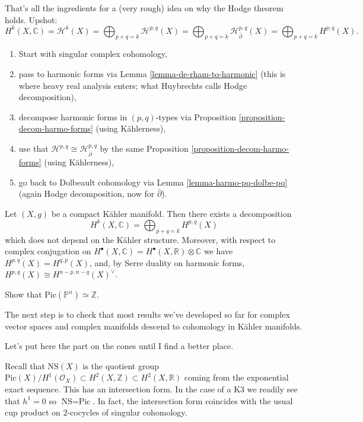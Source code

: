 \documentclass{book}
\begin{document}
\noindent
That's all the ingredients for a
(very rough) idea on why the Hodge theorem
holds.
Upshot:
$$
H^k(X,\mathbb{C})
= \mathcal{H}^k(X)
= \bigoplus_{p+q=k}\mathcal{H}^{p,q}(X)
=
\bigoplus_{p+q=k}\mathcal{H}^{p,q}
_{\bar\partial}(X)
=\bigoplus_{p+q=k}H^{p,q}(X).
$$
\begin{enumerate}
\item Start with singular complex cohomology,
\item pass to harmonic forms
via Lemma \ref{lemma-de-rham-to-harmonic}
(this is where heavy real analysis enters;
what Huybrechts calls Hodge decomposition),
\item decompose harmonic forms in
$(p,q)$-types
via Proposition
\ref{proposition-decom-harmo-forms}
(using Kählerness),
\item use that $\mathcal{H}^{p,q}\cong
\mathcal{H}^{p,q}_{\bar\partial}$
by the same Proposition
\ref{proposition-decom-harmo-forms}
(using Kählerness),
\item go back to Dolbeault cohomology
via Lemma \ref{lemma-harmo-pq-dolbe-pq}
(again Hodge decomposition, now for
$\bar\partial$).
\end{enumerate}

\begin{theorem}[Hodge]
\label{theorem-hodge-theorem}
Let $(X,g)$ be a compact Kähler manifold.
Then there exists a decomposition
$$
H^k(X,\mathbb{C})
= \bigoplus_{p+q=k}H^{p,q}(X)
$$
which does not depend on the Kähler
structure.
Moreover, with respect to complex conjugation
on
$H^\bullet(X,\mathbb{C})=H^\bullet(X,
\mathbb{R})\otimes\mathbb{C}$
we have
$\overline{H^{p,q}(X)}=H^{q,p}(X)$,
and, by Serre duality on harmonic forms,
$H^{p,q}(X) \cong H^{n-p,n-q}(X)^\vee$.
\end{theorem}

\begin{exercise}
\label{exercise-pic-of-pn-is-z}
\begin{reference}
\cite[Exercise 3.2.11]{huc}
\end{reference}
Show that $\text{Pic}(\mathbb{P}^n) \simeq
\mathbb{Z}$.
\end{exercise}

\noindent
The next step is to check
that most results we've developed so far for
complex vector spaces and complex manifolds
descend to cohomology in Kähler manifolds.


\medskip\noindent
Let's put here the part on the cones until
I find a better place.

Recall that $\text{NS}(X)$ is the quotient
group
$\text{Pic}(X)/H^1(\mathcal{O}_X)\subset
H^2(X,\mathbb{Z})
\subset H^2(X,\mathbb{R})$
coming from the exponential exact sequence.
This has an intersection form.
In the case of a K3 we readily see that
$h^1=0$ so $\text{NS}=\text{Pic}$.
In fact, the intersection form coincides with
the usual cup product on 2-cocycles of
singular cohomology.
\end{document}
